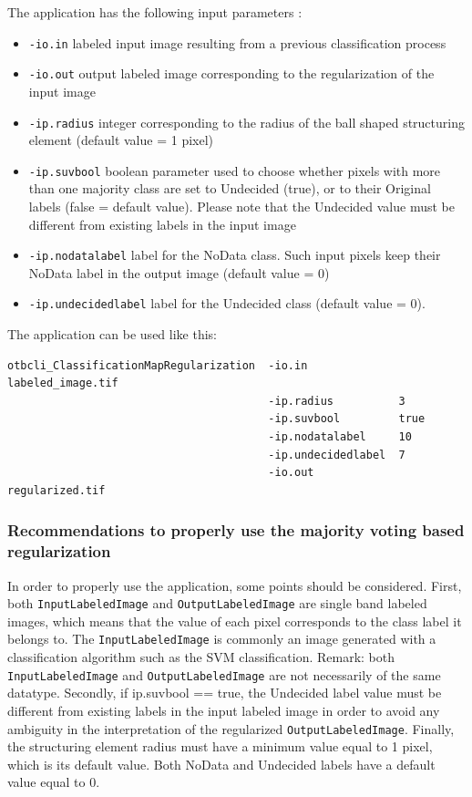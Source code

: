 The  application has the following input parameters :
\begin{itemize}
\item \verb?-io.in? labeled input image resulting from a previous classification process
\item \verb?-io.out? output labeled image corresponding to the regularization of the input image
\item \verb?-ip.radius? integer corresponding to the radius of the ball shaped structuring element (default value = 1 pixel)
\item \verb?-ip.suvbool? boolean parameter used to choose whether pixels with more than one majority class are set to Undecided (true),
or to their Original labels (false = default value). Please note that the Undecided value must be different from existing labels in the input image
\item \verb?-ip.nodatalabel? label for the NoData class. Such input pixels keep their NoData label in the output image (default value = 0)
\item \verb?-ip.undecidedlabel? label for the Undecided class (default value = 0).
\end{itemize}


The application can be used like this:
\begin{verbatim}
otbcli_ClassificationMapRegularization  -io.in              labeled_image.tif
                                        -ip.radius          3
                                        -ip.suvbool         true
                                        -ip.nodatalabel     10
                                        -ip.undecidedlabel  7
                                        -io.out             regularized.tif
\end{verbatim}
 

\subsubsection{Recommendations to properly use the majority voting based regularization}

In order to properly use the  application, some points should be considered.
First, both \verb?InputLabeledImage? and \verb?OutputLabeledImage? are single band labeled images, which means that the
value of each pixel corresponds to the class label it belongs to. The \verb?InputLabeledImage? is commonly an image generated
with a classification algorithm such as the SVM classification. Remark: both
\verb?InputLabeledImage? and \verb?OutputLabeledImage? are not necessarily of the same datatype. Secondly, if ip.suvbool == true,
the Undecided label value must be different from existing labels in the input labeled image in order to avoid any ambiguity in the
interpretation of the regularized \verb?OutputLabeledImage?. Finally, the structuring element radius must have a minimum value equal to 1 pixel,
which is its default value. Both NoData and Undecided labels have a default value equal to 0.


